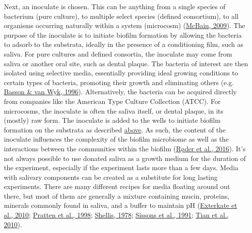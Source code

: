 \documentclass[
  letterpaper,
]{book}
\begin{document}
Next, an inoculate is chosen. This can be anything from a single species
of bacterium (pure culture), to multiple select species (defined
consortium), to all organisms occurring naturally within a system
(microcosm) (\protect\hyperlink{ref-mcbainBiofilmModels2009}{McBain,
2009}). The purpose of the inoculate is to initiate biofilm formation by
allowing the bacteria to adsorb to the substrata, ideally in the
presence of a conditioning film, such as saliva. For pure cultures and
defined consortia, the inoculate may come from saliva or another oral
site, such as dental plaque. The bacteria of interest are then isolated
using selective media, essentially providing ideal growing conditions to
certain types of bacteria, promoting their growth and eliminating others
(e.g. \protect\hyperlink{ref-bassonEstablishmentCommunity1996}{Basson \&
van Wyk, 1996}). Alternatively, the bacteria can be acquired directly
from companies like the American Type Culture Collection (ATCC). For
microcosms, the inoculate is often the saliva itself, or dental plaque,
in its (mostly) raw form. The inoculate is added to the wells to
initiate biofilm formation on the substrata as described
\protect\hyperlink{dental-plaque}{above}. As such, the content of the
inoculate influences the complexity of the biofilm microbiome as well as
the interactions between the communities within the biofilm
(\protect\hyperlink{ref-roderStudyingBacterial2016}{Røder et al.,
2016}). It's not always possible to use donated saliva as a growth
medium for the duration of the experiment, especially if the experiment
lasts more than a few days. Media with salivary components can be
created as a substitute for long lasting experiments. There are many
different recipes for media floating around out there, but most of them
are generally a mixture containing mucin, proteins, minerals commonly
found in saliva, and a buffer to maintain pH
(\protect\hyperlink{ref-extercateAAA2010}{Exterkate et al., 2010};
\protect\hyperlink{ref-prattenVitroStudies1998}{Pratten et al., 1998};
\protect\hyperlink{ref-shellisSyntheticSaliva1978}{Shellis, 1978};
\protect\hyperlink{ref-sissonsMultistationPlaque1991}{Sissons et al.,
1991}; \protect\hyperlink{ref-tianUsingDGGE2010}{Tian et al., 2010}).
\end{document}
